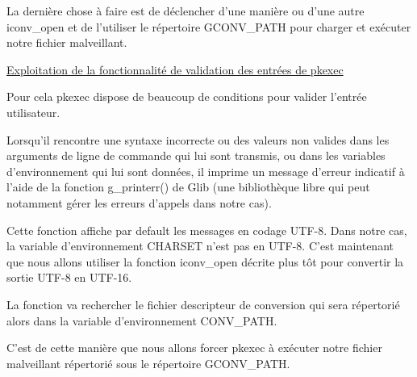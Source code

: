 \documentclass[12pt,a4paper]{article}
\begin{document}
\begin{flushleft}
            \item La dernière chose à faire est de déclencher d’une manière ou d’une autre iconv\_open et de l’utiliser le répertoire GCONV\_PATH pour charger et exécuter notre fichier malveillant.
            \item \underline{Exploitation de la fonctionnalité de validation des entrées de pkexec}
            \item Pour cela pkexec dispose de beaucoup de conditions pour valider l'entrée utilisateur.
            \item Lorsqu’il rencontre une syntaxe incorrecte ou des valeurs non valides dans les arguments de ligne de commande qui lui sont transmis, ou dans les variables d’environnement qui lui sont données, il imprime un message d’erreur indicatif à l’aide de la fonction g\_printerr() de Glib (une bibliothèque libre qui peut notamment gérer les erreurs d'appels dans notre cas).
            \item Cette fonction affiche par default les messages en codage UTF-8. Dans notre cas, la variable d'environnement CHARSET n'est pas en UTF-8. C'est maintenant que nous allons utiliser la fonction iconv\_open décrite plus tôt pour convertir la sortie UTF-8 en UTF-16.
            \item La fonction va rechercher le fichier descripteur de conversion qui sera répertorié alors dans la variable d'environnement CONV\_PATH.
            \item C'est de cette manière que nous allons forcer pkexec à exécuter notre fichier malveillant répertorié sous le répertoire GCONV\_PATH.



\end{flushleft}
\end{document}

